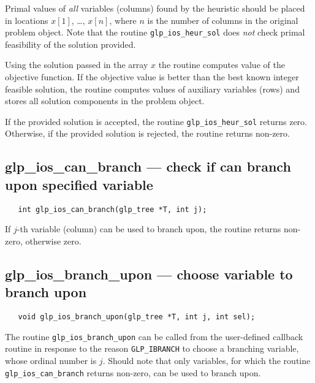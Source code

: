 Primal values of {\it all} variables (columns) found by the heuristic
should be placed in locations $x[1]$, \dots, $x[n]$, where $n$ is the
number of columns in the original problem object. Note that the routine
\verb|glp_ios_heur_sol| does {\it not} check primal feasibility of the
solution provided.

Using the solution passed in the array $x$ the routine computes value
of the objective function. If the objective value is better than the
best known integer feasible solution, the routine computes values of
auxiliary variables (rows) and stores all solution components in the
problem object.

\returns

If the provided solution is accepted, the routine
\verb|glp_ios_heur_sol| returns zero. Otherwise, if the provided
solution is rejected, the routine returns non-zero.

\vspace*{-5pt}

\subsection{glp\_ios\_can\_branch --- check if can branch upon
specified variable}

\synopsis

\begin{verbatim}
   int glp_ios_can_branch(glp_tree *T, int j);
\end{verbatim}

\returns

If $j$-th variable (column) can be used to branch upon, the routine
returns non-zero, otherwise zero.

\vspace*{-5pt}

\subsection{glp\_ios\_branch\_upon --- choose variable to branch upon}

\synopsis

\begin{verbatim}
   void glp_ios_branch_upon(glp_tree *T, int j, int sel);
\end{verbatim}

\description

The routine \verb|glp_ios_branch_upon| can be called from the
user-defined callback routine in response to the reason
\verb|GLP_IBRANCH| to choose a branching variable, whose ordinal number
\linebreak is $j$. Should note that only variables, for which the
routine \verb|glp_ios_can_branch| returns non-zero, can be used to
branch upon.

